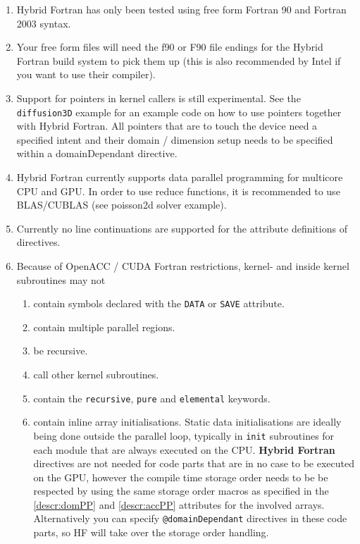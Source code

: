 \begin{enumerate}
 \item Hybrid Fortran has only been tested using free form Fortran 90 and Fortran 2003 syntax.
 \item Your free form files will need the f90 or F90 file endings for the Hybrid Fortran build system to pick them up (this is also recommended by Intel if you want to use their compiler).
 \item Support for pointers in kernel callers is still experimental. See the \verb|diffusion3D| example for an example code on how to use pointers together with Hybrid Fortran. All pointers that are to touch the device need a specified intent and their domain / dimension setup needs to be specified within a domainDependant directive.
 \item Hybrid Fortran currently supports data parallel programming for multicore CPU and GPU. In order to use reduce functions, it is recommended to use BLAS/CUBLAS (see poisson2d solver example).
 \item Currently no line continuations are supported for the attribute definitions of directives.
 \item Because of OpenACC / CUDA Fortran restrictions, kernel- and inside kernel subroutines may not
  \begin{enumerate}
   \item contain symbols declared with the \verb|DATA| or \verb|SAVE| attribute.
   \item contain multiple parallel regions.
   \item be recursive.
   \item call other kernel subroutines.
   \item contain the \verb|recursive|, \verb|pure| and \verb|elemental| keywords.
   \item contain inline array initialisations. Static data initialisations are ideally being done outside the parallel loop, typically in \verb|init| subroutines for each module that are always executed on the CPU. \textbf{Hybrid Fortran} directives are not needed for code parts that are in no case to be executed on the GPU, however the compile time storage order needs to be be respected by using the same storage order macros as specified in the \ref{descr:domPP} and \ref{descr:accPP} attributes for the involved arrays. Alternatively you can specify \verb|@domainDependant| directives in these code parts, so HF will take over the storage order handling.
  \end{enumerate}

\end{enumerate}

